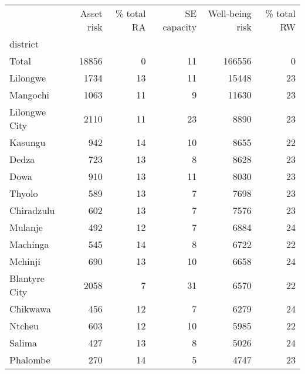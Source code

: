 \begin{tabular}{lrrrrr}
\toprule
{} &  Asset risk &  \% total RA &  SE capacity &  Well-being risk &  \% total RW \\
district       &             &             &              &                  &             \\
\midrule
Total          &       18856 &           0 &           11 &           166556 &           0 \\
Lilongwe       &        1734 &          13 &           11 &            15448 &          23 \\
Mangochi       &        1063 &          11 &            9 &            11630 &          23 \\
Lilongwe City  &        2110 &          11 &           23 &             8890 &          23 \\
Kasungu        &         942 &          14 &           10 &             8655 &          22 \\
Dedza          &         723 &          13 &            8 &             8628 &          23 \\
Dowa           &         910 &          13 &           11 &             8030 &          23 \\
Thyolo         &         589 &          13 &            7 &             7698 &          23 \\
Chiradzulu     &         602 &          13 &            7 &             7576 &          23 \\
Mulanje        &         492 &          12 &            7 &             6884 &          24 \\
Machinga       &         545 &          14 &            8 &             6722 &          22 \\
Mchinji        &         690 &          13 &           10 &             6658 &          24 \\
Blantyre City  &        2058 &           7 &           31 &             6570 &          22 \\
Chikwawa       &         456 &          12 &            7 &             6279 &          24 \\
Ntcheu         &         603 &          12 &           10 &             5985 &          22 \\
Salima         &         427 &          13 &            8 &             5026 &          24 \\
Phalombe       &         270 &          14 &            5 &             4747 &          23 \\

\end{tabular}
